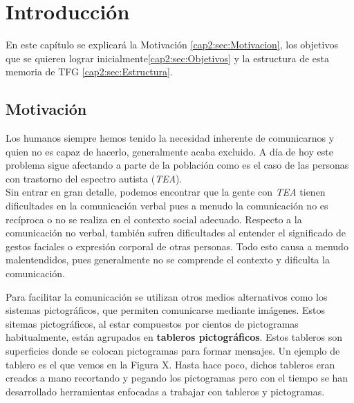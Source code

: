 \chapter{Introducción}
\label{cap:introduccion}


\begin{resumen} En este capítulo se explicará la Motivación \ref{cap2:sec:Motivacion}, los objetivos que se quieren lograr inicialmente\ref{cap2:sec:Objetivos} y la estructura de esta memoria de TFG \ref{cap2:sec:Estructura}. 
\end{resumen}
\section{Motivación}
\label{cap1:sec:Motivacion}

Los humanos siempre  hemos tenido la necesidad inherente de comunicarnos y quien no es capaz de hacerlo, generalmente acaba excluido. A día de hoy este problema sigue afectando a parte de la población como es el caso de las personas con trastorno del espectro autista (\textit{TEA}).\\

Sin entrar en gran detalle, podemos encontrar que la gente con \textit{TEA} tienen dificultades en la comunicación verbal pues a menudo la comunicación no es recíproca o no se realiza en el contexto social adecuado. Respecto a la comunicación no verbal, también sufren dificultades al entender el significado de gestos faciales o expresión corporal de otras personas. Todo esto causa a menudo malentendidos, pues generalmente no se comprende el contexto y dificulta la comunicación. 

Para facilitar la comunicación se utilizan otros medios alternativos como los sistemas pictográficos, que permiten comunicarse mediante imágenes. Estos sitemas pictográficos, al estar compuestos por cientos de pictogramas habitualmente, están agrupados en \textbf{tableros pictográficos}. Estos tableros son superficies donde se colocan pictogramas para formar mensajes. Un ejemplo de tablero es el que vemos en la Figura X. Hasta hace poco, dichos tableros eran creados a mano recortando y pegando los pictogramas pero con el tiempo se han desarrollado herramientas enfocadas a trabajar con tableros y pictogramas.

